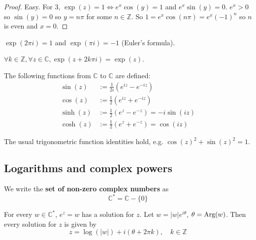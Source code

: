 \begin{proof}
	Easy. For 3, $\exp(z) = 1 \Longleftrightarrow e^x \cos(y) = 1$ and $e^x \sin(y) = 0$. $e^x > 0$ so $\sin(y) = 0$ so $y = n \pi$ for some $n \in \mathbb{Z}$. So $1 = e^x \cos(n \pi) = e^x {(-1)}^n$ so $n$ is even and $x = 0$.
\end{proof}

\begin{corollary}\label{cor:EulersFormula}
	$\exp(2 \pi i) = 1$ and $\exp(\pi i) = -1$ (Euler's formula).
\end{corollary}

\begin{corollary}
	$\forall k \in \mathbb{Z}, \forall z \in \mathbb{C}, \exp(z + 2k \pi i) = \exp(z)$.
\end{corollary}

\begin{definition}
	The following functions from $\mathbb{C}$ to $\mathbb{C}$ are defined:
	\[
		\begin{aligned}
			\sin(z) & := \frac{1}{2i} \left( e^{iz} - e^{-iz} \right) \\
			\cos(z) & := \frac{1}{2} \left( e^{iz} + e^{-iz} \right) \\
			\sinh(z) & := \frac{1}{2} \left( e^{z} - e^{-z} \right) = -i \sin(iz) \\
			\cosh(z) & := \frac{1}{2} \left( e^{z} + e^{-z} \right) = \cos(iz)
		\end{aligned}
	\]
\end{definition}

\begin{remark}
	The usual trigonometric function identities hold, e.g. $\cos(z)^2 + \sin(z)^2 = 1$.
\end{remark}

\subsection{Logarithms and complex powers}

\begin{definition}
	We write the \textbf{set of non-zero complex numbers} as
	\[
		\mathbb{C}^* = \mathbb{C} - \{ 0 \}
	\]
\end{definition}

\begin{lemma}
	For every $w \in \mathbb{C}^*$, $e^z = w$ has a solution for $z$. Let $w = |w| e^{i \theta}$, $\theta = \text{Arg}(w)$. Then every solution for $z$ is given by
	\[
		z = \log(|w|) + i (\theta + 2 \pi k), \quad k \in \mathbb{Z}
	\]
\end{lemma}

